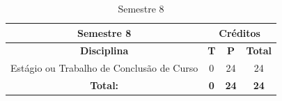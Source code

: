 
\begin{table}[H]
\caption{Semestre 8}
\centering
\footnotesize
\begin{tabular}{|c|c|c|c|} %
\hline
\hline
\multicolumn{1}{|c|}{\textbf{Semestre 8}}  &  \multicolumn{3}{|c|}{\textbf{Créditos}} \\
\hline
\hline
\textbf{Disciplina} &  \textbf{T}  &  \textbf{P}  & \textbf{Total} \\ 
\hline 

Estágio ou Trabalho de Conclusão de Curso & 0 & 24 & 24 \\

\hline

\hline

\textbf{Total:}  &  \textbf{0}  &  \textbf{24}   & \textbf{24} \\ 

\hline
\hline
\end{tabular}
\label{tab:matriz8}
\end{table}




